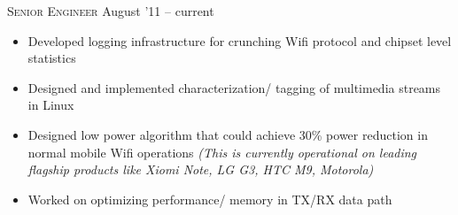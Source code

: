 \documentclass[10pt,a4paper]{article} %
\begin{document}
\headedsubsection %
{\textsc{Senior Engineer}} {August '11 -- current}
{\bodytext
  {\begin{itemize}
	\item Developed logging infrastructure for crunching Wifi protocol and chipset level statistics
	\item Designed and implemented characterization/ tagging of multimedia streams in Linux %
	\item Designed low power algorithm that could achieve 30\% power reduction in normal mobile Wifi operations \textit{(This is currently operational on leading flagship products  like Xiomi Note, LG G3, HTC M9, Motorola)}
	\item Worked on optimizing performance/ memory in TX/RX data path
\end{itemize}}

%
}

\end{document}
